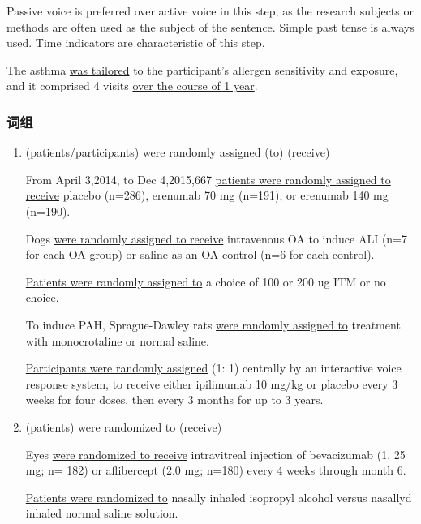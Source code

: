 \documentclass[a4paper]{ctexbook}
\begin{document}
    Passive voice is preferred over active voice in this step, as the research subjects or methods are often used as the subject of the sentence. Simple past tense is always used. Time indicators are characteristic of this step.

    \begin{eg}{}
      The asthma  \uline{was tailored} to the participant's allergen sensitivity and exposure, and it comprised 4 visits \uline{over the course of 1 year}.
    \end{eg}

    \subsubsection{词组}

    \begin{enumerate}
      \item (patients/participants) were randomly assigned (to) (receive)
      \begin{eg}{}
        From April 3,2014, to Dec 4,2015,667 \uline{patients were randomly assigned to receive} placebo (n=286), erenumab 70 mg (n=191), or erenumab 140 mg (n=190).
      \end{eg}

      \begin{eg}{}
        Dogs \uline{were randomly assigned to receive} intravenous OA to induce ALI (n=7 for each OA group) or saline as an OA control (n=6 for each control).
      \end{eg}

      \begin{eg}{}
        \uline{Patients were randomly assigned to} a choice of 100 or 200 ug ITM or no choice.
      \end{eg}

      \begin{eg}{}
        To induce PAH, Sprague-Dawley rats \uline{were randomly assigned to} treatment with monocrotaline or normal saline.
      \end{eg}

      \begin{eg}{}
        \uline{Participants were randomly assigned} (1: 1) centrally by an interactive voice response system, to receive either ipilimumab 10 mg/kg or placebo every 3 weeks for four doses, then every 3 months for up to 3 years.
      \end{eg}
      
      \item (patients) were randomized to (receive)
      \begin{eg}{}
        Eyes \uline{were randomized to receive} intravitreal injection of bevacizumab (1. 25 mg; n= 182) or aflibercept (2.0 mg; n=180) every 4 weeks through month 6.
      \end{eg}
      \begin{eg}{}
        \uline{Patients were randomized to} nasally inhaled isopropyl alcohol versus nasallyd inhaled normal saline solution.
      \end{eg}


\end{enumerate}
\end{document}
